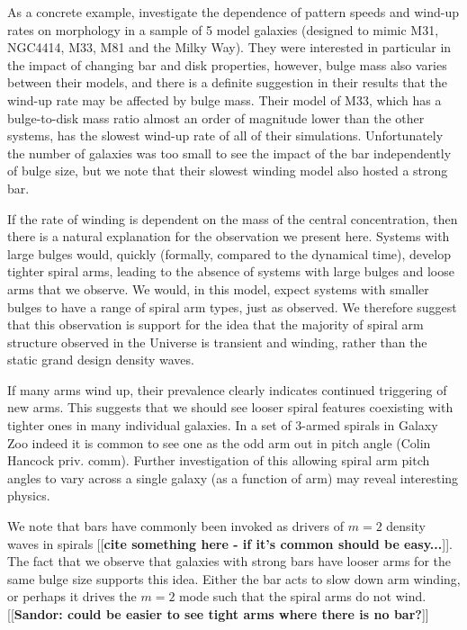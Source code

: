 \documentclass[usenatbib]{mn2e}
\newcommand{\comment}[2][todo]{{\color{#1}[[{\bf #2}]]}}
\begin{document}
  As a concrete example, \citet{PettittWadsley2018} investigate the dependence of pattern speeds and wind-up rates on morphology in a sample of 5 model galaxies (designed to mimic M31, NGC4414, M33, M81 and the Milky Way). They were interested in particular in the impact of changing bar and disk properties, however, bulge mass also varies between their models, and there is a definite suggestion in their results that the wind-up rate may be affected by bulge mass. Their model of M33, which has a bulge-to-disk mass ratio almost an order of magnitude lower than the other systems, has the slowest wind-up rate of all of their simulations. Unfortunately the number of galaxies was too small to see the impact of the bar independently of bulge size, but we note that their slowest winding model also hosted a strong bar.

If the rate of winding is dependent on the mass of the central concentration, then there is a natural explanation for the observation we present here. Systems with large bulges would, quickly (formally, compared to the dynamical time), develop tighter spiral arms, leading to the absence of systems with large bulges and loose arms that we observe. We would, in this model, expect systems with smaller bulges to have a range of spiral arm types, just as observed. We therefore suggest that this observation is support for the idea that the majority of spiral arm structure observed in the Universe is transient and winding, rather than the static grand design density waves. 

If many arms wind up, their prevalence clearly indicates continued triggering of new arms. This suggests that we should see
looser spiral features coexisting with tighter ones in many individual galaxies. In a set of 3-armed spirals in Galaxy Zoo indeed it is 
common to see one as the odd arm out in pitch angle (Colin Hancock priv. comm). Further investigation of this allowing spiral arm pitch angles to vary across a single galaxy (as a function of arm) may reveal interesting physics. 

 We note that bars have commonly been invoked as drivers of $m=2$ density waves in spirals \comment{cite something here - if it's common should be easy...}. The fact that we observe that galaxies with strong bars have looser arms for the same bulge size supports this idea. Either the bar acts to slow down arm winding, or perhaps it drives the $m=2$ mode such that the spiral arms do not wind. \comment{Sandor: could be easier to see tight arms where there is no bar?}
\end{document}
